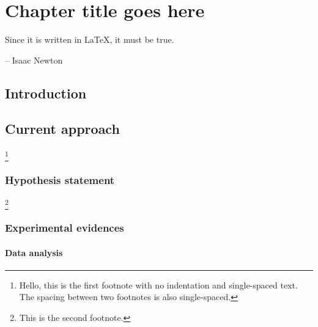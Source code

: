 \chapter{Chapter title goes here} \label{chap:chap-3}

\epigraph{Since it is written in \LaTeX, it must be true.}{-- Isaac Newton}


\section{Introduction}
\blindtext

\section{Current approach}
\blindtext\footnote{Hello, this is the first footnote with no
  indentation and single-spaced text. The spacing between two footnotes
is also single-spaced.}

\subsection{Hypothesis statement}
\blindtext\footnote{This is the second footnote.}

\subsection{Experimental evidences}
\blindtext

\subsubsection{Data analysis}
\blindtext
